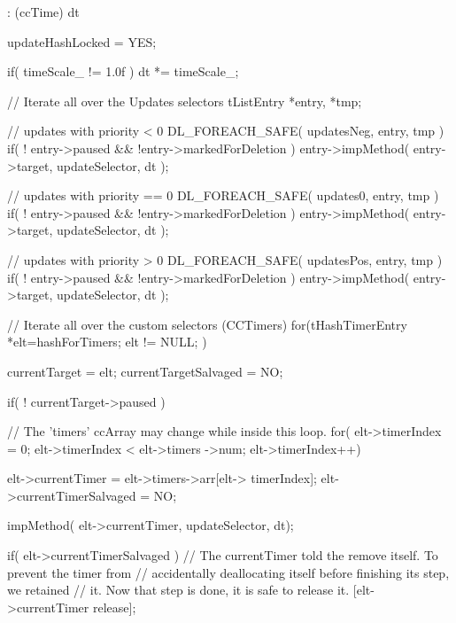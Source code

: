 \begin{DoxyCode}
              : (ccTime) dt
{
    updateHashLocked = YES;

        if( timeScale_ != 1.0f )
                dt *= timeScale_;

        // Iterate all over the Updates selectors
        tListEntry *entry, *tmp;

        // updates with priority < 0
        DL_FOREACH_SAFE( updatesNeg, entry, tmp ) {
                if( ! entry->paused && !entry->markedForDeletion )
                        entry->impMethod( entry->target, updateSelector, dt );
        }

        // updates with priority == 0
        DL_FOREACH_SAFE( updates0, entry, tmp ) {
                if( ! entry->paused && !entry->markedForDeletion )
        {
                        entry->impMethod( entry->target, updateSelector, dt );
        }
        }

        // updates with priority > 0
        DL_FOREACH_SAFE( updatesPos, entry, tmp ) {
                if( ! entry->paused  && !entry->markedForDeletion )
                        entry->impMethod( entry->target, updateSelector, dt );
        }

        // Iterate all over the custom selectors (CCTimers)
        for(tHashTimerEntry *elt=hashForTimers; elt != NULL; ) {

                currentTarget = elt;
                currentTargetSalvaged = NO;

                if( ! currentTarget->paused ) {

                        // The 'timers' ccArray may change while inside this
       loop.
                        for( elt->timerIndex = 0; elt->timerIndex < elt->timers
      ->num; elt->timerIndex++) {
                                elt->currentTimer = elt->timers->arr[elt->
      timerIndex];
                                elt->currentTimerSalvaged = NO;

                                impMethod( elt->currentTimer, updateSelector, 
      dt);

                                if( elt->currentTimerSalvaged ) {
                                        // The currentTimer told the remove
       itself. To prevent the timer from
                                        // accidentally deallocating itself
       before finishing its step, we retained
                                        // it. Now that step is done, it is
       safe to release it.
                                        [elt->currentTimer release];
                                }

}}}}
\end{DoxyCode}
